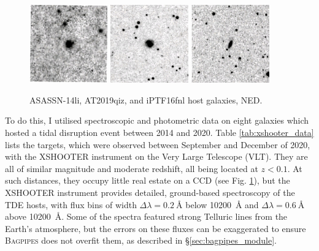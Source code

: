 \documentclass[a4paper,12pt]{article}
\begin{document}
\begin{figure}[h]
  \centering
  \includegraphics[width=0.3\textwidth]{ASASSN-14li_host_red}
  \includegraphics[width=0.3\textwidth]{AT2019qiz_host_red}
  \includegraphics[width=0.3\textwidth]{iPTF16fnl_host_red}
  \caption{ASASSN-14li, AT2019qiz, and iPTF16fnl host galaxies, NED.\cite{NED_1990}}
  \label{fig:xshooter_hosts}
\end{figure}

To do this, I utilised spectroscopic and photometric data on eight galaxies
which hosted a tidal disruption event between 2014 and 2020. Table
\ref{tab:xshooter_data} lists the targets, which were observed between
September and December of 2020, with the XSHOOTER instrument on the Very Large
Telescope (VLT). They are all of similar magnitude and moderate redshift, all
being located at $z<0.1$. At such distances, they occupy little real estate on
a CCD (see Fig. \ref{fig:xshooter_hosts}), but the XSHOOTER instrument provides
detailed, ground-based spectroscopy of the TDE hosts, with flux bins of width
$\Delta\lambda=\SI{0.2}{\angstrom}$ below \SI{10200}{\angstrom} and
$\Delta\lambda=\SI{0.6}{\angstrom}$ above \SI{10200}{\angstrom}. Some of the
spectra featured strong Telluric lines from the Earth's atmosphere, but the
errors on these fluxes can be exaggerated to ensure \textsc{Bagpipes} does not
overfit them, as described in \S\ref{sec:bagpipes_module}.
\end{document}
